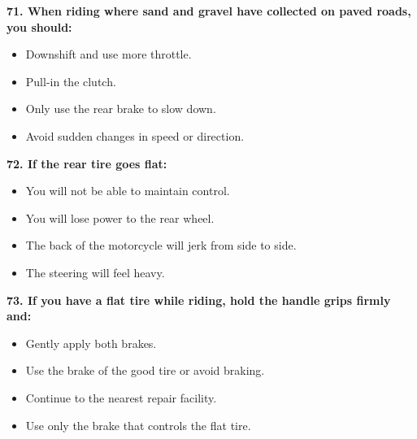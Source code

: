 \begin{minipage}{\linewidth}
\vspace{1em}\noindent\textbf{71. When riding where sand and gravel have collected on paved roads, you should:}

\begin{itemize}[nosep,leftmargin=2em]
\item [A.] Downshift and use more throttle.
\item [B.] Pull-in the clutch.
\item [C.] Only use the rear brake to slow down.
\item [D.] Avoid sudden changes in speed or direction.

\end{itemize}
\end{minipage}


\begin{minipage}{\linewidth}
\vspace{1em}\noindent\textbf{72. If the rear tire goes flat:}

\begin{itemize}[nosep,leftmargin=2em]
\item [A.] You will not be able to maintain control.
\item [B.] You will lose power to the rear wheel.
\item [C.] The back of the motorcycle will jerk from side to side.
\item [D.] The steering will feel heavy.

\end{itemize}
\end{minipage}


\begin{minipage}{\linewidth}
\vspace{1em}\noindent\textbf{73. If you have a flat tire while riding, hold the handle grips firmly and:}

\begin{itemize}[nosep,leftmargin=2em]
\item [A.] Gently apply both brakes.
\item [B.] Use the brake of the good tire or avoid braking.
\item [C.] Continue to the nearest repair facility.
\item [D.] Use only the brake that controls the flat tire.

\end{itemize}
\end{minipage}


